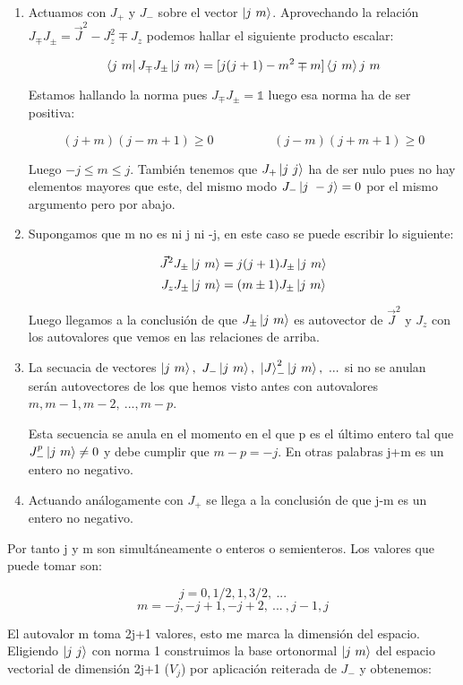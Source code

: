 \begin{enumerate}
\item Actuamos con $J_+$ y $J_-$ sobre el vector $\ket{j \ m}$. Aprovechando la relación $J_\mp J_\pm =\Vec{J}^2- J_z^2 \mp J_z$ podemos hallar el siguiente producto escalar:

$$\bra{ j \ m} J_\mp J_\pm  \ket{j \ m}= [j(j+1) - m^2 \mp m]\braket{j \ m}{j \ m}$$

Estamos hallando la norma pues $J_\mp J_\pm =\mathds{1}$ luego esa norma ha de ser positiva:

$$(j+m)(j-m+1) \geq 0 \hspace{2cm} (j-m)(j+m +1) \geq 0$$

Luego $-j \leq m \leq j$. También tenemos que $J_+ \ket{j \ j}$ ha de ser nulo pues no hay elementos mayores que este, del mismo modo $J_- \ket{j \ -j}=0$ por el mismo argumento pero por abajo.

\item Supongamos que m no es ni j ni -j, en este caso se puede escribir lo siguiente:

$$\Vec{J}^2J_\pm \ket{j \ m} =j(j+1) J_\pm \ket{j \ m}$$
$$J_z J_\pm \ket{ j \ m}= (m\pm 1)J_\pm \ket{j \ m}$$

Luego llegamos a la conclusión de que $J_\pm \ket{j \ m}$ es autovector de $\Vec{J}^2$ y $J_z$ con los autovalores que vemos en las relaciones de arriba.

\item La secuacia de vectores $\ket{j \ m}, \ J_- \ket{j \ m}, \ \ket{J}_-^2 \ket{j \ m}, \ ...$ si no se anulan serán autovectores de los que hemos visto antes con autovalores $m, m-1, m-2, \ ..., m-p$.

Esta secuencia se anula en el momento en el que p es el último entero tal que $J_-^p \ket{ j \ m} \neq 0$ y debe cumplir que $m-p=-j$. En otras palabras j+m es un entero no negativo.

\item Actuando análogamente con $J_+$ se llega a la conclusión de que j-m es un entero no negativo.
\end{enumerate}

Por tanto j y m son simultáneamente o enteros o semienteros. Los valores que puede tomar son:

$$j=0,1/2,1,3/2, \ ...$$
$$m=-j,-j+1,-j+2, \ ... \ , j-1, j$$

El autovalor m toma 2j+1 valores, esto me marca la dimensión del espacio. Eligiendo $\ket{ j \ j}$ con norma 1 construimos la base ortonormal $\ket{j \ m}$ del espacio vectorial de dimensión 2j+1 ($V_j$) por aplicación reiterada de $J_-$ y obtenemos:

